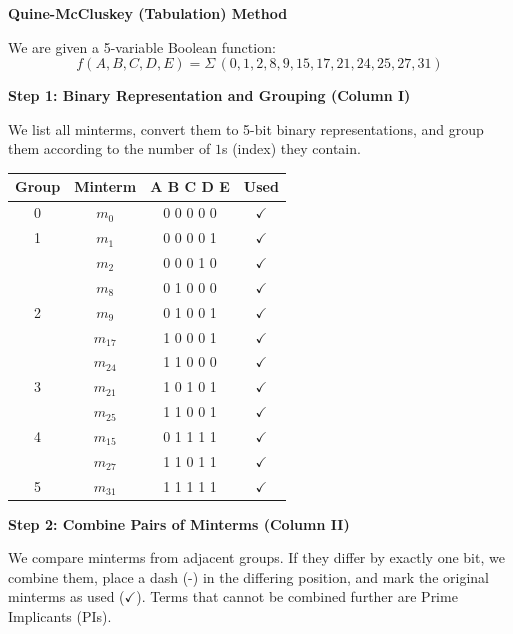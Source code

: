 \documentclass[12pt,a3paper]{article}
\begin{document}
\begin{enumerate}
\begin{tcolorbox}[enhanced,breakable,ansbox,colback=cC!4,colframe=cC,boxrule=0.8pt,arc=5pt,title={\textbf{Answer}},fonttitle=\bfseries\color{white},colbacktitle=cC]

\textbf{\large Quine-McCluskey (Tabulation) Method}

We are given a 5-variable Boolean function:
\[ f(A,B,C,D,E) = \Sigma\,(0,1,2,8,9,15,17,21,24,25,27,31) \]

\vspace{0.5em}
\textbf{\large Step 1: Binary Representation and Grouping (Column I)}

We list all minterms, convert them to 5-bit binary representations, and group them according to the number of $1$s (index) they contain.

\begin{center}
\begin{tabular}{cccc}
\toprule
\textbf{Group} & \textbf{Minterm} & \textbf{A B C D E} & \textbf{Used} \\
\midrule
0 & $m_0$  & 0 0 0 0 0 & $\checkmark$ \\
\midrule
1 & $m_1$  & 0 0 0 0 1 & $\checkmark$ \\
  & $m_2$  & 0 0 0 1 0 & $\checkmark$ \\
  & $m_8$  & 0 1 0 0 0 & $\checkmark$ \\
\midrule
2 & $m_9$  & 0 1 0 0 1 & $\checkmark$ \\
  & $m_{17}$ & 1 0 0 0 1 & $\checkmark$ \\
  & $m_{24}$ & 1 1 0 0 0 & $\checkmark$ \\
\midrule
3 & $m_{21}$ & 1 0 1 0 1 & $\checkmark$ \\
  & $m_{25}$ & 1 1 0 0 1 & $\checkmark$ \\
\midrule
4 & $m_{15}$ & 0 1 1 1 1 & $\checkmark$ \\
  & $m_{27}$ & 1 1 0 1 1 & $\checkmark$ \\
\midrule
5 & $m_{31}$ & 1 1 1 1 1 & $\checkmark$ \\
\bottomrule
\end{tabular}
\end{center}

\vspace{1em}
\textbf{\large Step 2: Combine Pairs of Minterms (Column II)}

We compare minterms from adjacent groups. If they differ by exactly one bit, we combine them, place a dash (-) in the differing position, and mark the original minterms as used ($\checkmark$). Terms that cannot be combined further are Prime Implicants (PIs).


\end{tcolorbox}
\end{enumerate}
\end{document}
